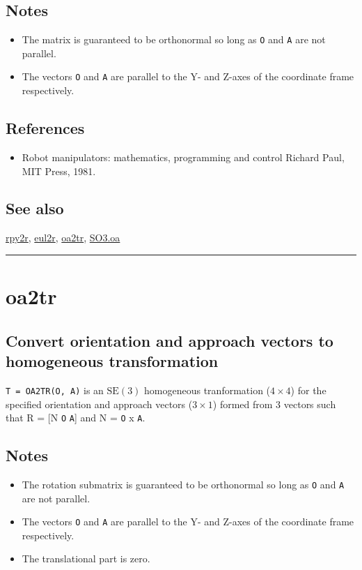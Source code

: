 \subsection*{Notes}
\begin{itemize}
  \item The matrix is guaranteed to be orthonormal so long as \texttt{O} and \texttt{A}    are not parallel.
  \item The vectors \texttt{O} and \texttt{A} are parallel to the Y- and Z-axes of the coordinate    frame respectively.
\end{itemize}

\subsection*{References}
\begin{itemize}
  \item Robot manipulators: mathematics, programming and control    Richard Paul, MIT Press, 1981.
\end{itemize}

\subsection*{See also}


\hyperlink{rpy2r}{\color{blue} rpy2r}, \hyperlink{eul2r}{\color{blue} eul2r}, \hyperlink{oa2tr}{\color{blue} oa2tr}, \hyperlink{SO3.oa}{\color{blue} SO3.oa}

\vspace{1.5ex}\rule{\textwidth}{1mm}

\hypertarget{oa2tr}{\section*{oa2tr}}
\subsection*{Convert orientation and approach vectors to homogeneous transformation}


\texttt{T = OA2TR(O, A)} is an $\mbox{SE}(3)$ homogeneous tranformation ($4 \times 4$) for the
specified orientation and approach vectors ($3 \times 1$) formed from 3 vectors
such that R = [N \texttt{O} \texttt{A}] and N = \texttt{O} x \texttt{A}.


\subsection*{Notes}
\begin{itemize}
  \item The rotation submatrix is guaranteed to be orthonormal so long as \texttt{O} and \texttt{A}    are not parallel.
  \item The vectors \texttt{O} and \texttt{A} are parallel to the Y- and Z-axes of the coordinate    frame respectively.
  \item The translational part is zero.
\end{itemize}

